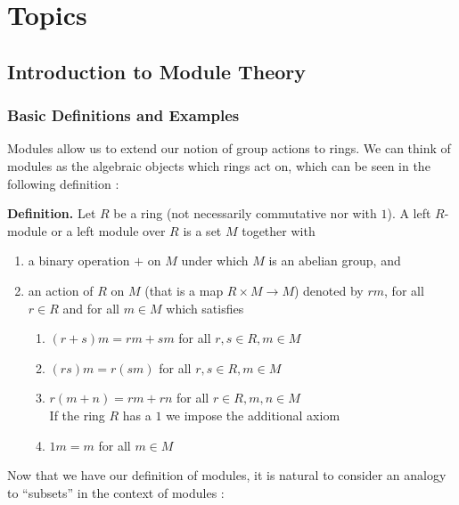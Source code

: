 \documentclass[11pt, reqno]{amsart}
\theoremstyle{plain}
\theoremstyle{definition}
\theoremstyle{example}
\begin{document}

\section{Topics}

\subsection{Introduction to Module Theory}

\subsubsection{Basic Definitions and Examples}

Modules allow us to extend our notion of group actions to rings. We can think of modules as the algebraic objects which rings act on, which can be seen in the following definition \cite[\S 10.1, p. 337]{dummit}:

\par
\textbf{Definition.} Let $R$ be a ring (not necessarily commutative nor with $1$). A left $R$-module or a left module over $R$ is a set $M$ together with
\begin{enumerate}
\item a binary operation $+$ on $M$ under which $M$ is an abelian group, and
\item an action of $R$ on $M$ (that is a map $R \times M \to M$) denoted by $rm$, for all $r \in R$ and for all $m \in M$ which satisfies
\begin{enumerate}[label=\alph*)]
\item $(r+s)m = rm + sm$ for all $r, s \in R, m \in M$
\item $(rs)m = r(sm)$ for all $r,s \in R, m \in M$
\item $r(m + n) = rm + rn$ for all $r \in R, m, n \in M$\\

If the ring $R$ has a $1$ we impose the additional axiom
\item $1m = m$ for all $m \in M$
\end{enumerate}
\end{enumerate}

Now that we have our definition of modules, it is natural to consider an analogy to ``subsets'' in the context of modules \cite[\S 10.1, p. 337]{dummit}:
\end{document}
